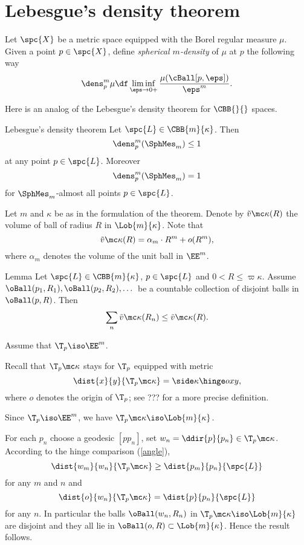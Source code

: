 \section{Lebesgue's density theorem}

Let $\spc{X}$ be a metric space
equipped with the Borel regular measure $\mu$. 
Given a point $p\in \spc{X}$, 
define \emph{spherical $m$-density} of $\mu$ at $p$
the following way
\[\dens^m_p\mu\df\liminf_{\eps\to0+}\frac{\mu(\cBall[p,\eps])}{\eps^m}.\]

Here is an analog of the Lebesgue's density theorem for $\CBB{}{}$ spaces.

\begin{thm}{Lebesgue's density theorem}\label{thm:lebesgue-density}
Let $\spc{L}\in\CBB{m}{\kappa}$.
Then 
\[\dens_p^m(\SphMes_m)\le 1\]
at any point $p\in \spc{L}$.
Moreover 
\[\dens_p^m(\SphMes_m)= 1\]
for $\SphMes_m$-almost all points $p\in \spc{L}$.
\end{thm}

Let $m$ and $\kappa$ be as in the formulation of the theorem.
Denote by $\tilde v\mc\kappa(R)$ the volume of ball of radius $R$ in $\Lob{m}{\kappa}$.
Note that
\[\tilde v\mc\kappa(R)=\alpha_m\cdot R^m+o(R^m),\]
where $\alpha_m$ denotes the volume of the unit ball in $\EE^m$.

\begin{thm}{Lemma}\label{lem:R_n<R}
Let $\spc{L}\in\CBB{m}{\kappa}$,
$p\in\spc{L}$ and $0<R\le \varpi\kappa$.
Assume $\oBall(p_1,R_1),\oBall(p_2,R_2),\dots$ be a countable collection of disjoint balls in $\oBall(p,R)$.
Then 
\[\sum_n \tilde v\mc\kappa(R_n)\le \tilde v\mc\kappa(R).\]

\end{thm}

Assume that $\T_p\iso \EE^m$.

Recall that $\T_{p}\mc\kappa$ stays for $\T_{p}$ 
equipped with metric
$$\dist{x}{y}{\T_{p}\mc\kappa}=\side\kappa\hinge o{x}{y},$$
where $o$ denotes the origin of $\T_{p}$;
see ??? for a more precise definition.

Since $\T_p\iso\EE^m$, we have $\T_p\mc\kappa\iso\Lob{m}{\kappa}$.

For each $p_n$ choose a geodesic $[pp_n]$,
set $w_n=\ddir{p}{p_n}\in\T_{p}\mc\kappa$.
According to the hinge comparison (\ref{angle}),
\[\dist{w_m}{w_n}{\T_{p}\mc\kappa}\ge \dist{p_m}{p_n}{\spc{L}}\]
for any $m$ and $n$
and 
\[\dist{o}{w_n}{\T_{p}\mc\kappa}= \dist{p}{p_n}{\spc{L}}\]
for any $n$.
In particular the balls $\oBall(w_n,R_n)$ in $\T_p\mc\kappa\iso\Lob{m}{\kappa}$ are disjoint and they all lie in $\oBall(o,R)\subset \Lob{m}{\kappa}$.
Hence the result follows.


